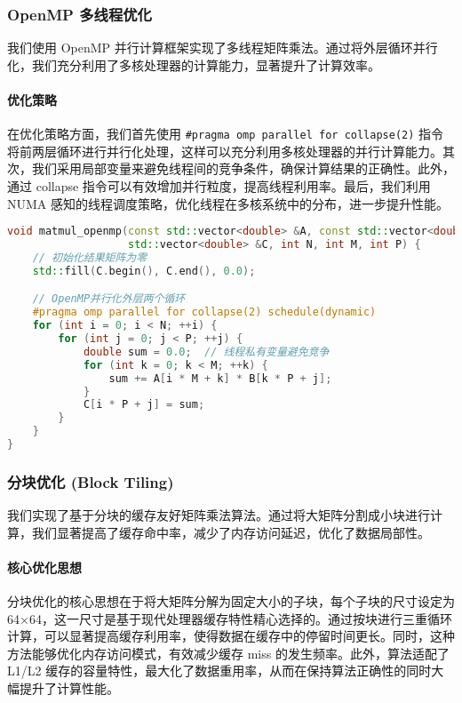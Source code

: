 \documentclass[a4paper]{article}
\begin{document}
\subsubsection{OpenMP 多线程优化}

我们使用 OpenMP 并行计算框架实现了多线程矩阵乘法。通过将外层循环并行化，我们充分利用了多核处理器的计算能力，显著提升了计算效率。

\paragraph{优化策略}

在优化策略方面，我们首先使用 \texttt{\#pragma omp parallel for collapse(2)} 指令将前两层循环进行并行化处理，这样可以充分利用多核处理器的并行计算能力。其次，我们采用局部变量来避免线程间的竞争条件，确保计算结果的正确性。此外，通过 collapse 指令可以有效增加并行粒度，提高线程利用率。最后，我们利用 NUMA 感知的线程调度策略，优化线程在多核系统中的分布，进一步提升性能。

\begin{lstlisting}[language=C++]
void matmul_openmp(const std::vector<double> &A, const std::vector<double> &B,
                   std::vector<double> &C, int N, int M, int P) {
    // 初始化结果矩阵为零
    std::fill(C.begin(), C.end(), 0.0);

    // OpenMP并行化外层两个循环
    #pragma omp parallel for collapse(2) schedule(dynamic)
    for (int i = 0; i < N; ++i) {
        for (int j = 0; j < P; ++j) {
            double sum = 0.0;  // 线程私有变量避免竞争
            for (int k = 0; k < M; ++k) {
                sum += A[i * M + k] * B[k * P + j];
            }
            C[i * P + j] = sum;
        }
    }
}
\end{lstlisting}

\subsubsection{分块优化 (Block Tiling)}

我们实现了基于分块的缓存友好矩阵乘法算法。通过将大矩阵分割成小块进行计算，我们显著提高了缓存命中率，减少了内存访问延迟，优化了数据局部性。

\paragraph{核心优化思想}

分块优化的核心思想在于将大矩阵分解为固定大小的子块，每个子块的尺寸设定为 64×64，这一尺寸是基于现代处理器缓存特性精心选择的。通过按块进行三重循环计算，可以显著提高缓存利用率，使得数据在缓存中的停留时间更长。同时，这种方法能够优化内存访问模式，有效减少缓存 miss 的发生频率。此外，算法适配了 L1/L2 缓存的容量特性，最大化了数据重用率，从而在保持算法正确性的同时大幅提升了计算性能。
\end{document}
